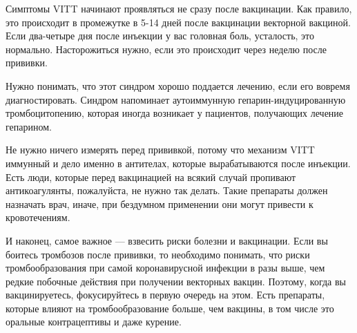 \begin{itemize}
\begin{itemize}

Симптомы VITT начинают проявляться не сразу после вакцинации. Как правило, это
происходит в промежутке в 5-14 дней после вакцинации векторной вакциной. Если
два-четыре дня после инъекции у вас головная боль, усталость, это нормально.
Насторожиться нужно, если это происходит через неделю после прививки.



Нужно понимать, что этот синдром хорошо поддается лечению, если его вовремя
диагностировать. Синдром напоминает аутоиммунную гепарин-индуцированную
тромбоцитопению, которая иногда возникает у пациентов, получающих лечение
гепарином.


Не нужно ничего измерять перед прививкой, потому что механизм VITT иммунный и
дело именно в антителах, которые вырабатываются после инъекции. Есть люди,
которые перед вакцинацией на всякий случай пропивают антикоагулянты,
пожалуйста, не нужно так делать. Такие препараты должен назначать врач, иначе,
при бездумном применении они могут привести к кровотечениям.


И наконец, самое важное — взвесить риски болезни и вакцинации. Если вы боитесь
тромбозов после прививки, то необходимо понимать, что риски тромбообразования
при самой коронавирусной инфекции в разы выше, чем редкие побочные действия при
получении векторных вакцин. Поэтому, когда вы вакцинируетесь, фокусируйтесь в
первую очередь на этом. Есть препараты, которые влияют на тромбообразование
больше, чем вакцины, в том числе это оральные контрацептивы и даже курение.

\end{itemize} %


\end{itemize} %
